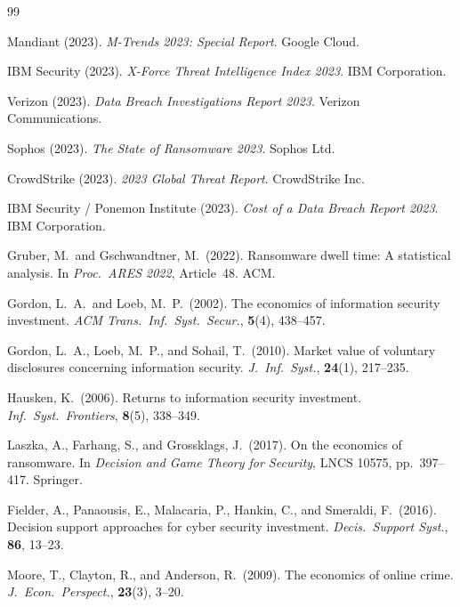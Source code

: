 \documentclass[12pt,a4paper]{article}
\theoremstyle{plain}
\theoremstyle{definition}
\theoremstyle{remark}
\begin{document}

\begin{thebibliography}{99}

Mandiant (2023).
\textit{M-Trends 2023: Special Report}.
Google Cloud.

IBM Security (2023).
\textit{X-Force Threat Intelligence Index 2023}.
IBM Corporation.

Verizon (2023).
\textit{Data Breach Investigations Report 2023}.
Verizon Communications.

Sophos (2023).
\textit{The State of Ransomware 2023}.
Sophos Ltd.

CrowdStrike (2023).
\textit{2023 Global Threat Report}.
CrowdStrike Inc.

IBM Security / Ponemon Institute (2023).
\textit{Cost of a Data Breach Report 2023}.
IBM Corporation.

Gruber, M.\ and Gschwandtner, M.\ (2022).
Ransomware dwell time: A statistical analysis.
In \textit{Proc.\ ARES 2022}, Article~48.
ACM.

Gordon, L.\ A.\ and Loeb, M.\ P.\ (2002).
The economics of information security investment.
\textit{ACM Trans.\ Inf.\ Syst.\ Secur.}, \textbf{5}(4), 438--457.

Gordon, L.\ A., Loeb, M.\ P., and Sohail, T.\ (2010).
Market value of voluntary disclosures concerning information security.
\textit{J.\ Inf.\ Syst.}, \textbf{24}(1), 217--235.

Hausken, K.\ (2006).
Returns to information security investment.
\textit{Inf.\ Syst.\ Frontiers}, \textbf{8}(5), 338--349.

Laszka, A., Farhang, S., and Grossklags, J.\ (2017).
On the economics of ransomware.
In \textit{Decision and Game Theory for Security},
LNCS 10575, pp.~397--417.
Springer.

Fielder, A., Panaousis, E., Malacaria, P., Hankin, C., and Smeraldi, F.\ (2016).
Decision support approaches for cyber security investment.
\textit{Decis.\ Support Syst.}, \textbf{86}, 13--23.

Moore, T., Clayton, R., and Anderson, R.\ (2009).
The economics of online crime.
\textit{J.\ Econ.\ Perspect.}, \textbf{23}(3), 3--20.


\end{thebibliography}
\end{document}
